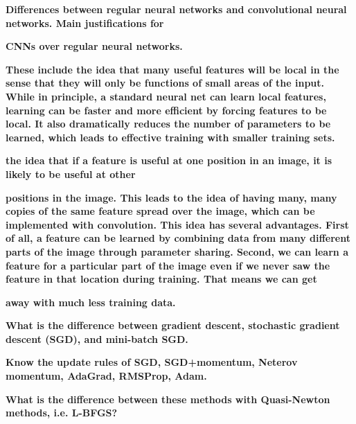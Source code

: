 \documentclass[10pt,letterpaper]{article}
\begin{document}
\begin{solution}
\end{solution}
\subitem \textbf{ Differences between regular neural networks and convolutional neural networks. Main justifications for}
\begin{solution}
\end{solution}
\subitem \textbf{ CNNs over regular neural networks. }
\begin{solution}
\end{solution}
\subsubitem \textbf{ These include the idea that many useful features will be local in the sense that they will only be functions of small areas of the input. While in principle, a standard neural net can learn local features, learning can be faster and more efficient by forcing features to be local. It also dramatically reduces the number of parameters to be learned, which leads to effective training with smaller training sets.}
\begin{solution}
\end{solution}
\subsubitem \textbf{ the idea that if a feature is useful at one position in an image, it is likely to be useful at other}
\begin{solution}
\end{solution}
\subitem \textbf{ positions in the image. This leads to the idea of having many, many copies of the same feature spread over the image, which can be implemented with convolution. This idea has several advantages. First of all, a feature can be learned by combining data from many different parts of the image through parameter sharing. Second, we can learn a feature for a particular part of the image even if we never saw the feature in that location during training. That means we can get}
\begin{solution}
\end{solution}
\subitem \textbf{  away with much less training data.}
\begin{solution}
\end{solution}
\subitem \textbf{ What is the difference between gradient descent, stochastic gradient descent (SGD), and mini-batch SGD.}
\begin{solution}
\end{solution}
\subitem \textbf{ Know the update rules of SGD, SGD+momentum, Neterov momentum, AdaGrad, RMSProp, Adam.}
\begin{solution}
\end{solution}
\subitem \textbf{ What is the difference between these methods with Quasi-Newton methods, i.e. L-BFGS?}
\end{document}
